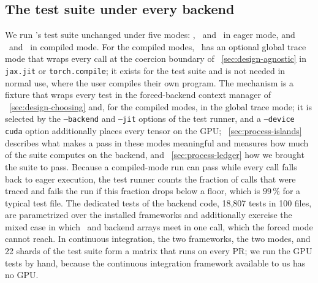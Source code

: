 \subsection{The test suite under every backend}\label{sec:design-tests}

We run \galpy's test suite unchanged under five modes: \numpy, \jax\ and
\torch\ in eager mode, and \jax\ and \torch\ in compiled mode. For
the compiled modes, \galpy\ has an optional global trace mode that
wraps every call at the coercion boundary of
\sectionname~\ref{sec:design-agnostic} in \texttt{jax.jit} or
\texttt{torch.compile}; it exists for the test suite and is not needed
in normal use, where the user compiles their own program. The
mechanism is a fixture that wraps every test in the forced-backend
context manager of \sectionname~\ref{sec:design-choosing} and, for the
compiled modes, in the global trace mode; it is selected by the
\texttt{--backend} and \texttt{--jit} options of the test runner, and a
\texttt{--device cuda} option additionally places every tensor on the
GPU; \sectionname~\ref{sec:process-islands} describes what makes a pass
in these modes meaningful and measures how much of the suite computes on
the backend, and \sectionname~\ref{sec:process-ledger} how we brought
the suite to pass. Because a compiled-mode run can
pass while every call falls back to eager execution, the test runner
counts the fraction of calls that were traced and fails the run if this
fraction drops below a floor, which is $99\,\%$ for a typical test
file. The dedicated tests of
the backend code, 18,807 tests in 100 files, are parametrized over the
installed frameworks and additionally exercise the mixed case in which
\numpy\ and backend arrays meet in one call, which the forced mode
cannot reach. In continuous integration, the two frameworks, the two
modes, and 22 shards of the test suite form a matrix that runs on every
PR; we run the GPU tests by hand, because the continuous integration framework 
available to us has no GPU.
